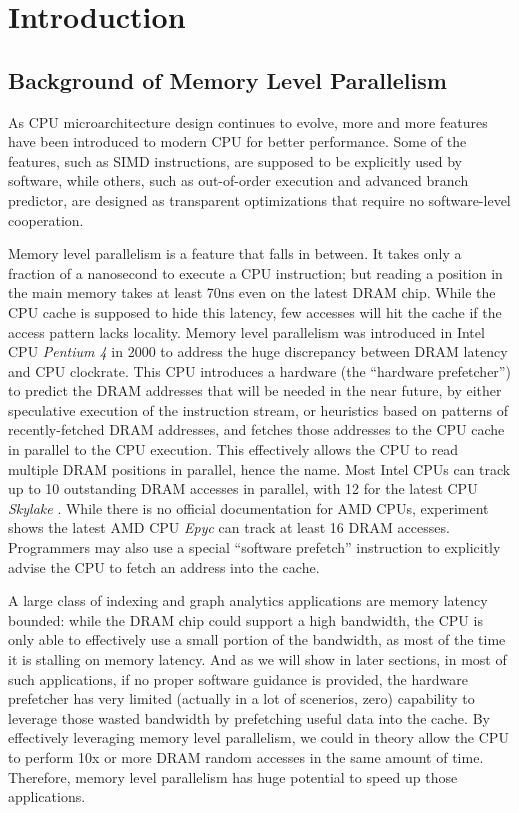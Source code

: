 \documentclass[11pt, usletter]{article}
\begin{document}
\newpage

\tableofcontents

\newpage

\section{Introduction} \label{introduction}

\subsection{Background of Memory Level Parallelism}

As CPU microarchitecture design continues to evolve, more and more features have been introduced 
to modern CPU for better performance. Some of the features, such as SIMD instructions, 
are supposed to be explicitly used by software, while others, such as out-of-order execution 
and advanced branch predictor, are designed as transparent optimizations that require no 
software-level cooperation.

Memory level parallelism is a feature that falls in between. 
It takes only a fraction of a nanosecond to execute a CPU instruction; 
but reading a position in the main memory takes at least 70ns even on the latest DRAM chip.
While the CPU cache is supposed to hide this latency, few accesses will hit the cache if the access pattern lacks locality.
Memory level parallelism was introduced in Intel CPU \textit{Pentium 4} in 2000 
to address the huge discrepancy between DRAM latency and CPU clockrate.
This CPU introduces a hardware (the ``hardware prefetcher'') to predict the DRAM addresses that will be needed in the near future, 
by either speculative execution of the instruction stream, 
or heuristics based on patterns of recently-fetched DRAM addresses, 
and fetches those addresses to the CPU cache in parallel to the CPU execution.
This effectively allows the CPU to read multiple DRAM positions in parallel, hence the name.
Most Intel CPUs can track up to 10 outstanding DRAM accesses in parallel, 
with 12 for the latest CPU \textit{Skylake} \cite{IntelOptGuide}.
While there is no official documentation for AMD CPUs, 
experiment shows the latest AMD CPU \textit{Epyc} can track at least 16 DRAM accesses. 
Programmers may also use a special ``software prefetch'' instruction to
explicitly advise the CPU to fetch an address into the cache.

A large class of indexing and graph analytics applications are memory latency bounded: 
while the DRAM chip could support a high bandwidth, 
the CPU is only able to effectively use a small portion of the bandwidth, 
as most of the time it is stalling on memory latency.
And as we will show in later sections, 
in most of such applications, if no proper software guidance is provided, 
the hardware prefetcher has very limited (actually in a lot of scenerios, zero)
capability to leverage those wasted bandwidth by prefetching useful data into the cache. 
By effectively leveraging memory level parallelism, 
we could in theory allow the CPU to perform 10x or more DRAM random accesses 
in the same amount of time. Therefore, memory level parallelism has huge potential to speed up those applications.
\end{document}
